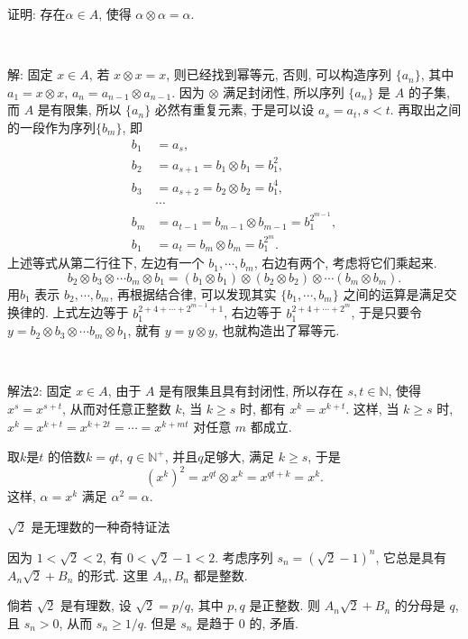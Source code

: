 证明: 存在$\alpha\in A$, 使得 $\alpha\otimes\alpha=\alpha$.


~

解: 固定 $x\in A$, 若 $x\otimes x = x$, 则已经找到幂等元, 否则, 可以构造序列 $\{a_n\}$, 其中 $a_1=x\otimes x$, $a_{n}=a_{n-1}\otimes a_{n-1}$. 因为 $\otimes$ 满足封闭性, 所以序列 $\{a_n\}$ 是 $A$ 的子集, 而 $A$  是有限集, 所以 $\{a_n\}$ 必然有重复元素, 于是可以设 $a_s = a_t, s<t$. 再取出之间的一段作为序列$\{b_m\}$, 即
\begin{align*}
b_1&=a_s,\\ 
b_2&=a_{s+1}=b_1\otimes b_1 = b_1^2,\\ 
b_3&=a_{s+2}=b_2\otimes b_2 = b_1^4,\\
&\cdots\\ 
b_m&=a_{t-1} = b_{m-1}\otimes b_{m-1} = b_1^{2^{m-1}},\\
b_1&=a_t=b_{m}\otimes b_m=b_1^{2^m}.
\end{align*}
上述等式从第二行往下, 左边有一个 $b_1, \cdots, b_m$, 右边有两个, 考虑将它们乘起来.
\[b_2\otimes b_3\otimes\cdots b_m\otimes b_1 = (b_1\otimes b_1)\otimes(b_2\otimes b_2)\otimes\cdots(b_m\otimes b_m).\]
用$b_1$ 表示 $b_2,\cdots,b_m$, 再根据结合律, 可以发现其实 $\{b_1, \cdots, b_m\}$ 之间的运算是满足交换律的. 上式左边等于 $b_1^{2+4+\cdots+2^{m-1}+1}$, 右边等于 $b_1^{2+4+\cdots+2^m}$, 于是只要令 $y=b_2\otimes b_3\otimes\cdots b_m\otimes b_1$, 就有 $y=y\otimes y$, 也就构造出了幂等元.

~

解法2: 固定 $x\in A$, 由于 $A$ 是有限集且具有封闭性, 所以存在 $s,t\in\mathbb{N}$, 使得 $x^s = x^{s+t}$, 从而对任意正整数 $k$, 当 $k\ge s$ 时, 都有 $x^k=x^{k+t}$. 这样, 当 $k\ge s$ 时, $x^k=x^{k+t}=x^{k+2t}=\cdots=x^{k+mt}$ 对任意 $m$ 都成立.

取$k$是$t$ 的倍数$k=qt$, $q\in\mathbb{N}^+$, 并且$q$足够大, 满足 $k\ge s$, 于是
\[ (x^k)^2 = x^{qt}\otimes x^k=x^{qt+k}=x^k .\]
这样, $\alpha=x^k$ 满足 $\alpha^2=\alpha$.

\newpage
\noindent $\sqrt{2}$ 是无理数的一种奇特证法

因为 $1<\sqrt{2}<2$, 有 $0<\sqrt{2}-1<2$. 考虑序列 $s_n = (\sqrt{2}-1)^n$, 它总是具有 $A_n\sqrt{2}+B_n$ 的形式. 这里 $A_n, B_n$ 都是整数.

倘若 $\sqrt{2}$ 是有理数, 设 $\sqrt{2} = p/q$, 其中 $p,q$ 是正整数. 则 $A_n\sqrt{2}+B_n$ 的分母是 $q$, 且 $s_n>0$, 从而 $s_n \ge 1/q$. 但是 $s_n$ 是趋于 0 的, 矛盾.

\newpage

